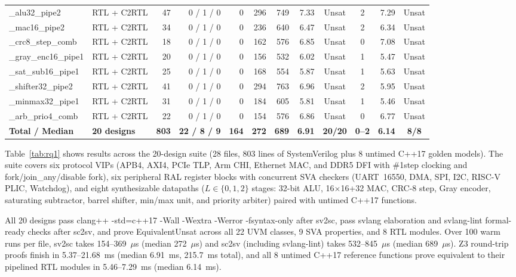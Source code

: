 \documentclass[conference]{IEEEtran}
\newcommand{\code}[1]{{\fontshape{n}\ttfamily #1}}
\begin{document}
\begin{table}[t]
\begin{tabular}{@{}l l r r r r r r c c r c@{}}
\midrule
\code{13\_alu32\_pipe2}        & RTL + C2RTL & 47 & 0 / 1 / 0 &  0 & 296 & 749 &  7.33 & \code{Unsat} & 2  & 7.29 & \code{Unsat} \\
\code{14\_mac16\_pipe2}        & RTL + C2RTL & 34 & 0 / 1 / 0 &  0 & 236 & 640 &  6.47 & \code{Unsat} & 2  & 6.34 & \code{Unsat} \\
\code{15\_crc8\_step\_comb}    & RTL + C2RTL & 18 & 0 / 1 / 0 &  0 & 162 & 576 &  6.85 & \code{Unsat} & 0  & 7.08 & \code{Unsat} \\
\code{16\_gray\_enc16\_pipe1}  & RTL + C2RTL & 20 & 0 / 1 / 0 &  0 & 156 & 532 &  6.02 & \code{Unsat} & 1  & 5.47 & \code{Unsat} \\
\code{17\_sat\_sub16\_pipe1}   & RTL + C2RTL & 25 & 0 / 1 / 0 &  0 & 168 & 554 &  5.87 & \code{Unsat} & 1  & 5.63 & \code{Unsat} \\
\code{18\_shifter32\_pipe2}    & RTL + C2RTL & 41 & 0 / 1 / 0 &  0 & 294 & 763 &  6.96 & \code{Unsat} & 2  & 5.95 & \code{Unsat} \\
\code{19\_minmax32\_pipe1}     & RTL + C2RTL & 31 & 0 / 1 / 0 &  0 & 184 & 605 &  5.81 & \code{Unsat} & 1  & 5.46 & \code{Unsat} \\
\code{20\_arb\_prio4\_comb}    & RTL + C2RTL & 22 & 0 / 1 / 0 &  0 & 154 & 576 &  6.86 & \code{Unsat} & 0  & 6.77 & \code{Unsat} \\
\midrule
\textbf{Total / Median}        & \textbf{20 designs} & \textbf{803} & \textbf{22 / 8 / 9} & \textbf{164} & \textbf{272} & \textbf{689} & \textbf{6.91} & \textbf{20/20} & \textbf{0--2} & \textbf{6.14} & \textbf{8/8} \\
\bottomrule
\end{tabular}
\end{table}

Table~\ref{tab:rq1} shows results across the 20-design suite (28 files, 803 lines of SystemVerilog plus 8 untimed C++17 golden models). The suite covers six protocol VIPs (APB4, AXI4, PCIe TLP, Arm CHI, Ethernet MAC, and DDR5 DFI with \code{\#1step} clocking and \code{fork}/\code{join\_any}/\code{disable fork}), six peripheral RAL register blocks with concurrent SVA checkers (UART~16550, DMA, SPI, I2C, RISC-V PLIC, Watchdog), and eight synthesizable datapaths ($L \in \{0, 1, 2\}$ stages: 32-bit ALU, 16$\times$16+32 MAC, CRC-8 step, Gray encoder, saturating subtractor, barrel shifter, min/max unit, and priority arbiter) paired with untimed C++17 functions.

All 20 designs pass \code{clang++ -std=c++17 -Wall -Wextra -Werror -fsyntax-only} after \code{sv2sc}, pass \code{svlang} elaboration and \code{svlang-lint} \code{formal-ready} checks after \code{sc2sv}, and prove \code{EquivalentUnsat} across all 22 UVM classes, 9 SVA properties, and 8 RTL modules. Over 100 warm runs per file, \code{sv2sc} takes 154--369~$\mu$s (median 272~$\mu$s) and \code{sc2sv} (including \code{svlang-lint}) takes 532--845~$\mu$s (median 689~$\mu$s). Z3 round-trip proofs finish in 5.37--21.68~ms (median 6.91~ms, 215.7~ms total), and all 8 untimed C++17 reference functions prove equivalent to their pipelined RTL modules in 5.46--7.29~ms (median 6.14~ms).
\end{document}
